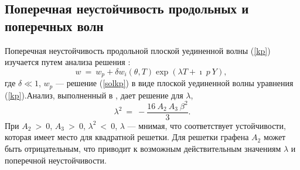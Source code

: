\subsection{Поперечная неустойчивость продольных и поперечных волн}

Поперечная неустойчивость продольной плоской уединенной волны (\ref {kp}) изучается путем анализа решения \cite{Ablowitz}:
\begin{equation}
	w~=~w_p+\delta w_i (\theta,T)\exp (\lambda T +\imath~p~ Y),~\label{stlong}
\end{equation}
где $ \delta \ll 1 $, $ w_p $ --- решение (\ref {solkp}) в виде плоской уединенной волны уравнения (\ref{kp}).Анализ, выполненный в \cite{porkros}, дает решение для $\lambda$,
\begin{equation}
	\lambda^2~=~-\frac{16~A_2~ A_3~\beta^2}{3}.
\end{equation}
При $ A_2 ~> ~ 0 $, $ A_3 ~> ~ 0 $, $ \lambda ^ 2 ~ <~ 0 $, $ \lambda $ --- мнимая, что соответствует устойчивости, которая имеет место для квадратной решетки. Для решетки графена $ A_2 $ может быть отрицательным, что приводит к возможным действительным значениям $ \lambda $ и поперечной неустойчивости.

